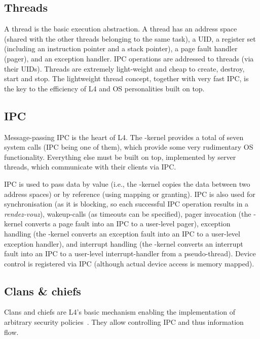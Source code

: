 \subsection{Threads}

A thread is the basic execution abstraction. A thread has an address
space (shared with the other threads belonging to the same task), a UID,
a register set (including an instruction pointer and a stack pointer), a
page fault handler (pager), and an exception handler. IPC operations are
addressed to threads (via their UIDs). Threads are extremely
light-weight and cheap to create, destroy, start and stop. The
lightweight thread concept, together with very fast IPC, is the key to
the efficiency of L4 and OS personalities built on top.


\subsection{IPC}

Message-passing IPC is the heart of L4. The \micro-kernel provides a
total of seven system calls (IPC being one of them), which provide some
very rudimentary OS functionality. Everything else must be built on top,
implemented by server threads, which communicate with their clients via
IPC.

IPC is used to pass data by value (i.e., the \micro-kernel copies the
data between two address spaces) or by reference (using mapping or
granting). IPC is also used for synchronisation (as it is blocking, so
each successful IPC operation results in a \emph{rendez-vouz}),
wakeup-calls (as timeouts can be specified), pager invocation (the
\micro-kernel converts a page fault into an IPC to a user-level pager),
exception handling (the \micro-kernel converts an exception fault into
an IPC to a user-level exception handler), and interrupt handling (the
\micro-kernel converts an interrupt fault into an IPC to a user-level
interrupt-handler from a pseudo-thread). Device control is registered
via IPC (although actual device access is memory mapped).


\subsection{\label{s:i:c&c}Clans \& chiefs}

Clans and chiefs are L4's basic mechanism enabling the implementation of
arbitrary security policies~\cite{Liedtke_92}. They allow controlling
IPC and thus information flow.

